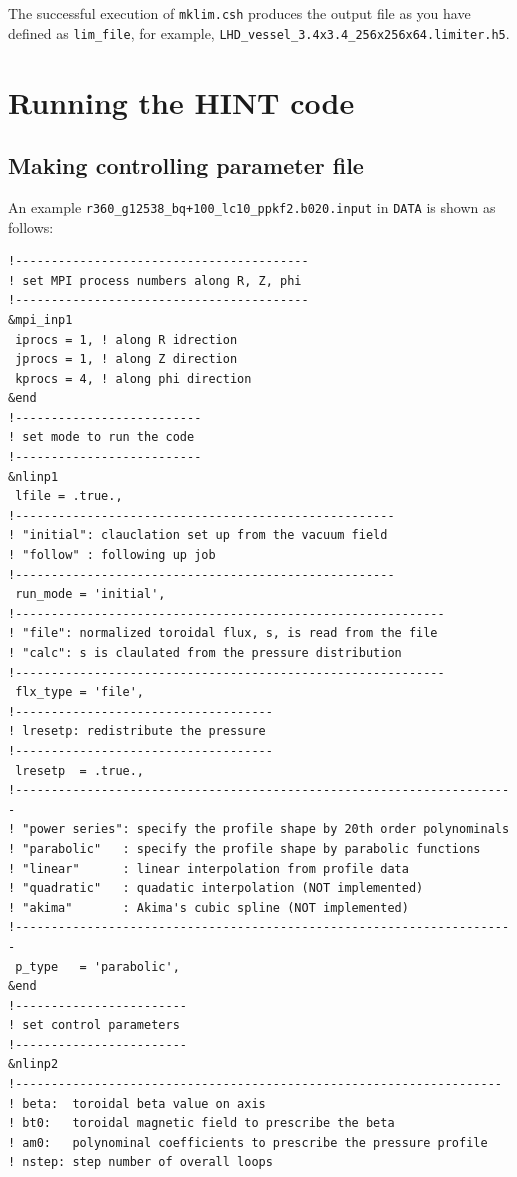 \documentclass[10pt]{ltxdoc} %
\begin{document}
The successful execution of \texttt{mklim.csh} produces the output file as you have defined as \texttt{lim\_file}, for example, \texttt{LHD\_vessel\_3.4x3.4\_256x256x64.limiter.h5}. 
  

\section{Running the HINT code}
\subsection{Making controlling parameter file}  

An example \verb|r360_g12538_bq+100_lc10_ppkf2.b020.input| in \texttt{DATA} is shown as follows:
\begin{verbatim}
!-----------------------------------------
! set MPI process numbers along R, Z, phi
!-----------------------------------------
&mpi_inp1
 iprocs = 1, ! along R idrection
 jprocs = 1, ! along Z direction
 kprocs = 4, ! along phi direction
&end
!--------------------------
! set mode to run the code
!--------------------------
&nlinp1
 lfile = .true.,
!-----------------------------------------------------
! "initial": clauclation set up from the vacuum field
! "follow" : following up job
!-----------------------------------------------------
 run_mode = 'initial',
!------------------------------------------------------------
! "file": normalized toroidal flux, s, is read from the file
! "calc": s is claulated from the pressure distribution
!------------------------------------------------------------
 flx_type = 'file',
!------------------------------------
! lresetp: redistribute the pressure
!------------------------------------
 lresetp  = .true.,
!----------------------------------------------------------------------
! "power series": specify the profile shape by 20th order polynominals
! "parabolic"   : specify the profile shape by parabolic functions
! "linear"      : linear interpolation from profile data
! "quadratic"   : quadatic interpolation (NOT implemented)
! "akima"       : Akima's cubic spline (NOT implemented)
!----------------------------------------------------------------------
 p_type   = 'parabolic',
&end
!------------------------
! set control parameters
!------------------------
&nlinp2
!--------------------------------------------------------------------
! beta:  toroidal beta value on axis
! bt0:   toroidal magnetic field to prescribe the beta
! am0:   polynominal coefficients to prescribe the pressure profile
! nstep: step number of overall loops

\end{verbatim}
\end{document}
